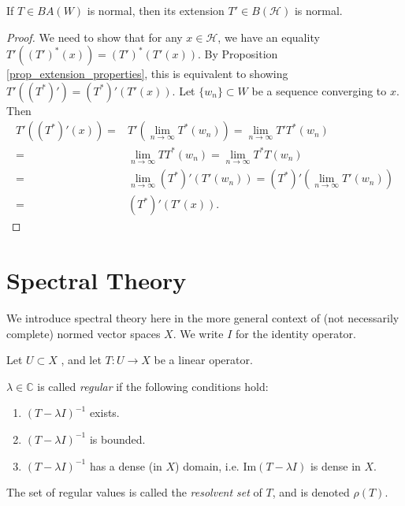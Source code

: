 \documentclass[12pt]{article}
\begin{document}
\begin{proposition}
	If $T\in BA(W)$ is normal, then its extension $T'\in B(\mathcal{H})$ is normal.
\end{proposition}
\begin{proof}
	We need to show that for any $x\in\mathcal{H}$, we have an equality $T'((T')^\ast(x))=(T')^\ast(T'(x))$. By Proposition \ref{prop_extension_properties}, this is equivalent to showing $T'((T^\ast)') = (T^\ast)'(T'(x))$. Let $\{w_n\}\subset W$ be a sequence converging to $x$. Then 
	\begin{align*}
		T'((T^\ast)'(x)) =& T'(\lim_{n\to\infty}T^\ast(w_n)) = \lim_{n\to\infty}T'T^\ast(w_n) \\
		=& \lim_{n\to\infty}TT^\ast(w_n) = \lim_{n\to\infty}T^\ast T(w_n) \\
		=& \lim_{n\to\infty} (T^\ast)'( T'(w_n) ) = (T^\ast)'(\lim_{n\to\infty}T'(w_n)) \\
		=& (T^\ast)'(T'(x)).
	\end{align*}
\end{proof}


\section{Spectral Theory} %


We introduce spectral theory here in the more general context of (not necessarily complete) normed vector spaces $X$. We write $I$ for the identity operator.

Let $U\subset X$ , and let $T:U \to X$ be a linear operator.

\begin{definition} %
\label{def_regular}
	$\lambda\in\mathbb{C}$ is called \emph{regular} if the following conditions hold:
	\begin{enumerate}[label=R\arabic*.,ref=R\arabic*]
		\item\label{def_regular_exists} $(T-\lambda I)^{-1}$ exists.
		\item\label{def_regular_bounded} $(T-\lambda I)^{-1}$ is bounded.
		\item\label{def_regular_dense} $(T-\lambda I)^{-1}$ has a dense (in $X$) domain, i.e. $\text{Im}(T-\lambda I)$ is dense in $X$.
	\end{enumerate}
\end{definition}

\begin{definition} %
\label{def_resolvent_set}
	The set of regular values is called the \emph{resolvent set} of $T$, and is denoted $\rho(T)$.
\end{definition}
\end{document}

